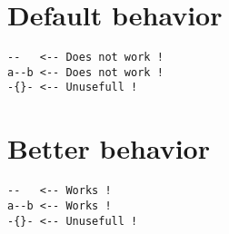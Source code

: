 \documentclass[a4paper,10pt]{article}
\begin{document}
\section{Default behavior}

\begin{lstlisting}
--   <-- Does not work !
a--b <-- Does not work !
-{}- <-- Unusefull !
\end{lstlisting}


\section{Better behavior}

\begin{lstlisting}
--   <-- Works !
a--b <-- Works !
-{}- <-- Unusefull !
\end{lstlisting}
\end{document}
